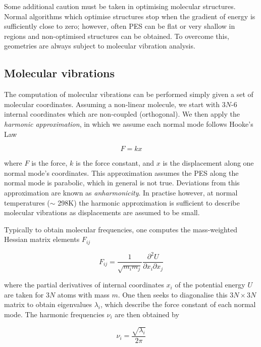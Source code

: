 Some additional caution must be taken in optimising molecular structures. Normal
algorithms which optimise structures stop when the gradient of energy is
sufficiently close to zero; however, often PES can be flat or very shallow in
regions and non-optimised structures can be obtained. To overcome this,
geometries are always subject to molecular vibration analysis.

\subsection{Molecular vibrations}

The computation of molecular vibrations can be performed simply given a set of
molecular coordinates.\cite{Wilson1980} Assuming a non-linear molecule, we start
with 3$N$-6 internal coordinates which are non-coupled (orthogonal). We then
apply the \emph{harmonic approximation}, in which we assume each normal mode
follows Hooke's Law

\begin{equation}
  F = kx
\end{equation}


\noindent where $F$ is the force, $k$ is the force constant, and $x$ is the
displacement along one normal mode's coordinates. This approximation assumes the
PES along the normal mode is parabolic, which in general is not true. Deviations
from this approximation are known as \emph{anharmonicity}. In practise however,
at normal temperatures ($\sim$ 298K) the harmonic approximation is sufficient to
describe molecular vibrations as displacements are assumed to be small.

Typically to obtain molecular frequencies, one computes the mass-weighted
Hessian matrix elements $F_{ij}$

\begin{equation}
  F_{ij} = \frac{1}{\sqrt{m_im_j}}\frac{\partial^2U}{\partial x_i\partial x_j}
\end{equation}

\noindent where the partial derivatives of internal coordinates $x_i$ of the
potential energy $U$ are taken for 3$N$ atoms with mass $m$. One then seeks to
diagonalise this $3N\times3N$ matrix to obtain eigenvalues $\lambda_i$, which
describe the force constant of each normal mode. The harmonic frequencies $\nu_i$ are
then obtained by

\begin{equation}
  \nu_i = \frac{\sqrt{\lambda_i}}{2\pi}
\end{equation}

